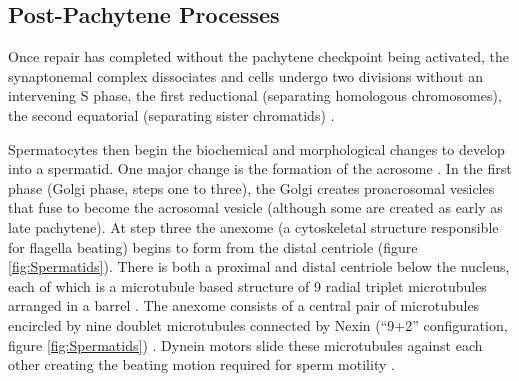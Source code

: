 \subsection{Post-Pachytene Processes}
Once repair has completed without the pachytene checkpoint being activated, the synaptonemal complex dissociates and cells undergo two divisions without an intervening S phase, the first reductional (separating homologous chromosomes), the second equatorial (separating sister chromatids) \parencite{Roeder2000pachytene, Subramanian2014Meiotic, Watanabe2012Geometry}.

Spermatocytes then begin the biochemical and morphological changes to develop into a spermatid.
One major change is the formation of the acrosome \parencite[reviewed in][]{Buffone2016Sperm, Khawar2019Mechanism}.
In the first phase (Golgi phase, steps one to three), the Golgi creates proacrosomal vesicles that fuse to become the acrosomal vesicle (although some are created as early as late pachytene).
At step three the anexome (a cytoskeletal structure responsible for flagella beating) begins to form from the distal centriole (figure \ref{fig:Spermatids}).
There is both a proximal and distal centriole below the nucleus, each of which is a microtubule based structure of 9 radial triplet microtubules arranged in a barrel \parencite{Fawcett1969fine, Avidor-Reiss2019It}.
The anexome consists of a central pair of microtubules encircled by nine doublet microtubules connected by Nexin (``9+2'' configuration, figure \ref{fig:Spermatids}) \parencite{Linck2016axoneme, Lehti2017Formation}.
Dynein motors slide these microtubules against each other creating the beating motion required for sperm motility \parencite{Mitchison2010How}.


